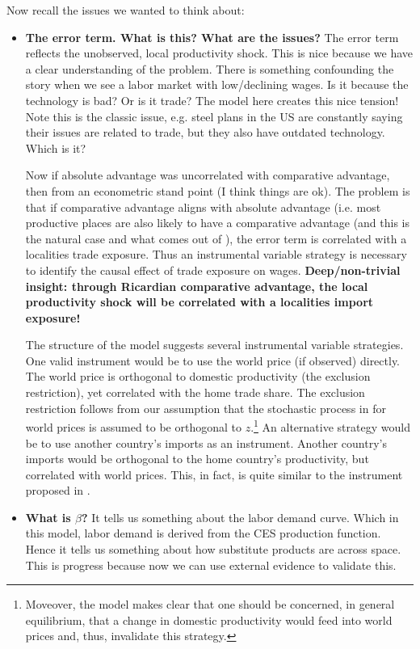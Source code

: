 \documentclass[pdftex,12pt]{article}
\begin{document}
\medskip
\noindent Now recall the issues we wanted to think about:
\begin{itemize}
\item \textbf{The error term. What is this? What are the issues?} The error term reflects the unobserved, local productivity shock. This is nice because we have a clear understanding of the problem. There is something confounding the story when we see a labor market with low/declining wages. Is it because the technology is bad? Or is it trade? The model here creates this nice tension! Note this is the classic issue, e.g. steel plans in the US are constantly saying their issues are related to trade, but they also have outdated technology. Which is it? 

    Now if absolute advantage was uncorrelated with comparative advantage, then from an econometric stand point (I think things are ok). The problem is that if comparative advantage aligns with absolute advantage (i.e. most productive places are also likely to have a comparative advantage (and this is the natural case and what comes out of \citet{eaton2002technology}), the error term is correlated with a localities trade exposure.  Thus an instrumental variable strategy is necessary to identify the causal effect of trade exposure on wages. \textbf{Deep/non-trivial insight: through Ricardian comparative advantage, the local productivity shock will be correlated with a localities import exposure!}

    The structure of the model suggests several instrumental variable strategies. One valid instrument would be to use the world price (if observed) directly. The world price is orthogonal to domestic productivity (the exclusion restriction), yet correlated with the home trade share. The exclusion restriction follows from our assumption that the stochastic process in for world prices is assumed to be orthogonal to $z$.\footnote{Moveover, the model makes clear that one should be concerned, in general equilibrium, that a change in domestic productivity would feed into world prices and, thus, invalidate this strategy.} An alternative strategy would be to use another country's imports as an instrument. Another country's imports would be orthogonal to the home country's productivity, but correlated with world prices. This, in fact, is quite similar to the instrument proposed in \citet{david2013china}.

\item \textbf{What is $\beta$?} It tells us something about the labor demand curve. Which in this model, labor demand is derived from the CES production function. Hence it tells us something about how substitute products are across space. This is progress because now we can use external evidence to validate this.


\end{itemize}
\end{document}
